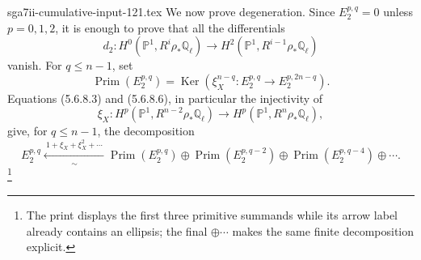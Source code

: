 \begin{filecontents*}{sga7ii-cumulative-input-121.tex}
We now prove degeneration.  Since $E_2^{p,q}=0$ unless $p=0,1,2$, it is
enough to prove that all the differentials
\[
d_2:H^0(\mathbb P^1,R^i\rho_*\mathbb Q_\ell)
\longrightarrow H^2(\mathbb P^1,R^{i-1}\rho_*\mathbb Q_\ell)
\]
vanish.  For $q\leq n-1$, set
\begin{equation}\tag{5.6.8.9}
\operatorname{Prim}(E_2^{p,q})
=\operatorname{Ker}\!\left(
\xi_X^{n-q}:E_2^{p,q}\longrightarrow E_2^{p,2n-q}
\right).
\end{equation}
Equations (5.6.8.3) and (5.6.8.6), in particular the injectivity of
\[
\xi_X:H^p(\mathbb P^1,R^{n-2}\rho_*\mathbb Q_\ell)
\longrightarrow H^p(\mathbb P^1,R^n\rho_*\mathbb Q_\ell),
\]
give, for $q\leq n-1$, the decomposition
\begin{equation}\tag{5.6.8.10}
E_2^{p,q}
\xleftarrow[\sim]{\ 1+\xi_X+\xi_X^2+\cdots\ }
\operatorname{Prim}(E_2^{p,q})
\oplus\operatorname{Prim}(E_2^{p,q-2})
\oplus\operatorname{Prim}(E_2^{p,q-4})
\oplus\cdots.
\end{equation}
\footnote{The print displays the first three primitive summands while its
arrow label already contains an ellipsis; the final $\oplus\cdots$ makes the
same finite decomposition explicit.}
\end{filecontents*}
